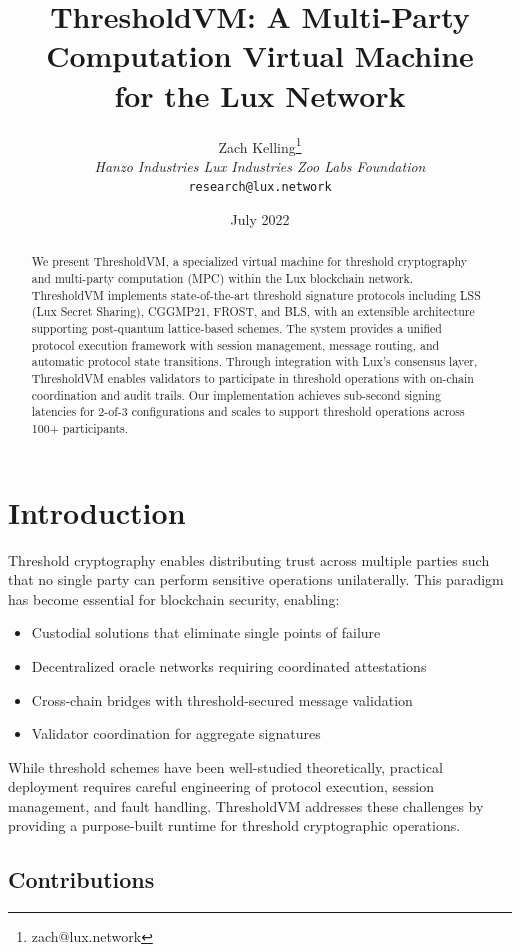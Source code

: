 \documentclass[11pt,twocolumn]{article}
\title{ThresholdVM: A Multi-Party Computation Virtual Machine\\for the Lux Network}
\author{Zach Kelling\thanks{zach@lux.network} \\ \textit{Hanzo Industries \quad Lux Industries \quad Zoo Labs Foundation} \\ \texttt{research@lux.network}}
\date{July 2022}
\begin{document}
\maketitle

\begin{abstract}
We present ThresholdVM, a specialized virtual machine for threshold cryptography and multi-party computation (MPC) within the Lux blockchain network. ThresholdVM implements state-of-the-art threshold signature protocols including LSS (Lux Secret Sharing), CGGMP21, FROST, and BLS, with an extensible architecture supporting post-quantum lattice-based schemes. The system provides a unified protocol execution framework with session management, message routing, and automatic protocol state transitions. Through integration with Lux's consensus layer, ThresholdVM enables validators to participate in threshold operations with on-chain coordination and audit trails. Our implementation achieves sub-second signing latencies for 2-of-3 configurations and scales to support threshold operations across 100+ participants.
\end{abstract}

\section{Introduction}

Threshold cryptography enables distributing trust across multiple parties such that no single party can perform sensitive operations unilaterally. This paradigm has become essential for blockchain security, enabling:

\begin{itemize}
\item Custodial solutions that eliminate single points of failure
\item Decentralized oracle networks requiring coordinated attestations
\item Cross-chain bridges with threshold-secured message validation
\item Validator coordination for aggregate signatures
\end{itemize}

While threshold schemes have been well-studied theoretically, practical deployment requires careful engineering of protocol execution, session management, and fault handling. ThresholdVM addresses these challenges by providing a purpose-built runtime for threshold cryptographic operations.

\subsection{Contributions}
\end{document}
